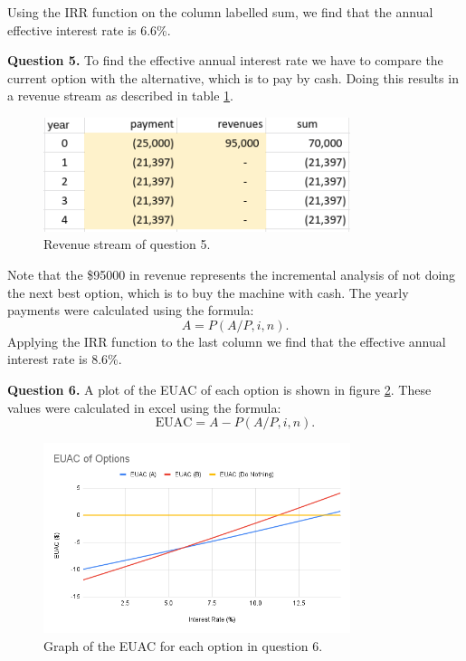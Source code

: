 \documentclass[letterpaper, reqno,11pt]{article}
\begin{document}
Using the IRR function on the column labelled sum, we find that the annual effective interest rate is 6.6\%. 


{\noindent\bf Question 5.} To find the effective annual interest rate we have to compare the current option with the alternative, which is to pay by cash. Doing this results in a revenue stream as described in table \ref{fig:q5}. 

\begin{figure}[htpb]
    \centering
    \includegraphics[width=0.8\textwidth]{q5}
    \caption{Revenue stream of question 5. }
    \label{fig:q5}
\end{figure}

Note that the \$95000 in revenue represents the incremental analysis of not doing the next best option, which is to buy the machine with cash. The yearly payments were calculated using the formula: 
 \[
A=P (A /P, i, n)
.\]
Applying the IRR function to the last column we find that the effective annual interest rate is 8.6\%. 

{\noindent\bf Question 6.} A plot of the EUAC of each option is shown in figure \ref{fig:q6}. These values were calculated in excel using the formula: 
\[
\text{EUAC}=A-P(A /P, i, n)
.\]

\begin{figure}[htpb]
    \centering
    \includegraphics[width=0.8\textwidth]{q6.png}
    \caption{Graph of the EUAC for each option in question 6. }
    \label{fig:q6}
\end{figure}
\end{document}
